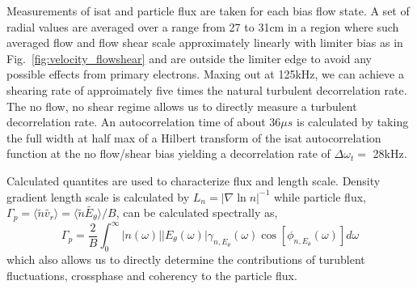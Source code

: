 \documentclass[%
 aps,
 prl,
 amsmath,amssymb,
 reprint,%
]{revtex4-1}
\begin{document}
Measurements of isat and particle flux are taken for each bias flow state. A set of radial values are averaged over a range from 27 to 31cm in a region where such averaged flow and flow shear scale approximately linearly with limiter bias as in 
Fig.~\ref{fig:velocity_flowshear}
and are outside the limiter edge to avoid any possible effects from primary electrons. Maxing out at 125kHz, we can achieve a shearing rate of approimately five times the natural turbulent decorrelation rate. The no flow, no shear regime allows us to directly measure a turbulent decorrelation rate. An autocorrelation time of about $36 \mu s$ is calculated by taking the full width at half max of a Hilbert transform of the isat autocorrelation function at the no flow/shear bias yielding a decorrelation rate of $\Delta \omega_{t} = $ 28kHz.

Calculated quantites are used to characterize flux and length scale. Density gradient length scale is calculated by $L_{n} = \lvert \nabla \ln n \rvert ^{-1}$ while particle flux, $\Gamma_{p} = \langle \tilde{n} \tilde{v_{r}} \rangle = \langle \tilde{n} \tilde{E_{\theta}} \rangle /B$, can be calculated spectrally as\cite{powers74}, 
\begin{equation}
\Gamma_{p} = \frac{2}{B} \int^{\infty}_{0} \lvert n(\omega) \rvert \lvert E_{\theta}(\omega) \rvert \gamma_{n,E_{\theta}}(\omega) \cos [\phi_{n,E_{\theta}}(\omega)] d\omega
\label{eq:fluxint}
\end{equation}
which also allows us to directly determine the contributions of turublent fluctuations, crossphase and coherency to the particle flux.
\end{document}
